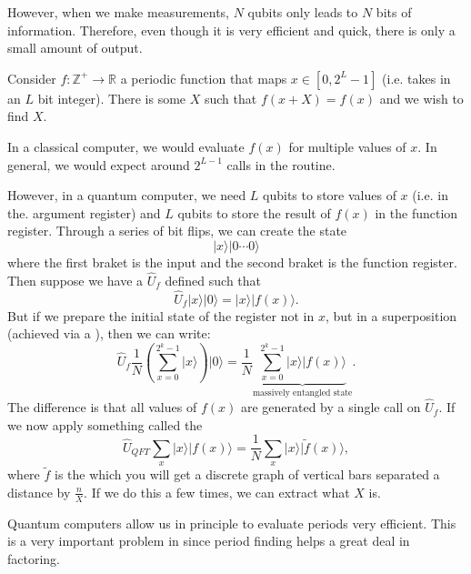 \documentclass{article}
\numberwithin{equation}{section}
\begin{document}
However, when we make measurements, $N$ qubits only leads to $N$ bits of information. Therefore, even though it is very efficient and quick, there is only a small amount of output.
\begin{example}
    Consider $f:\mathbb{Z}^+\rightarrow \mathbb{R}$ a periodic function that maps $x\in [0,2^L-1]$ (i.e. takes in an $L$ bit integer). There is some $X$ such that $f(x+X)=f(x)$ and we wish to find $X$.
    \vspace{2mm}

    In a classical computer, we would evaluate $f(x)$ for multiple values of $x$. In general, we would expect around $2^{L-1}$ calls in the routine.
    \vspace{2mm}

    However, in a quantum computer, we need $L$ qubits to store values of $x$ (i.e. in the. argument register) and $L$ qubits to store the result of $f(x)$ in the function register. Through a series of bit flips, we can create the state 
    \begin{equation}
        |x\rangle|0\cdots 0\rangle
    \end{equation}
    where the first braket is the input and the second braket is the function register. Then suppose we have a  $\hat{U}_f$ defined such that
    \begin{equation}
        \hat{U}_f|x\rangle |0\rangle = |x\rangle |f(x)\rangle.
    \end{equation}
    But if we prepare the initial state of the register not in $x$, but in a superposition (achieved via a ), then we can write:
    \begin{equation}
        \hat{U}_f\frac{1}{N}\left(\sum_{x=0}^{2^k-1} |x\rangle\right)|0\rangle = \frac{1}{N} \underbrace{\sum_{x=0}^{2^k-1} |x\rangle |f(x)\rangle}_{\text{massively entangled state}}.
    \end{equation}
    The difference is that all values of $f(x)$ are generated by a single call on $\hat{U}_f$. If we now apply something called the 
    \begin{equation}
        \hat{U}_{QFT}\sum_x |x\rangle |f(x)\rangle = \frac{1}{N} \sum_x |x\rangle |\tilde{f}(x)\rangle,
    \end{equation}
    where $\tilde{f}$ is the  which you will get a discrete graph of vertical bars separated a distance by $\frac{n}{X}.$ If we do this a few times, we can extract what $X$ is.
\end{example}
Quantum computers allow us in principle to evaluate periods very efficient. This is a very important problem in  since period finding helps a great deal in factoring.
\end{document}
